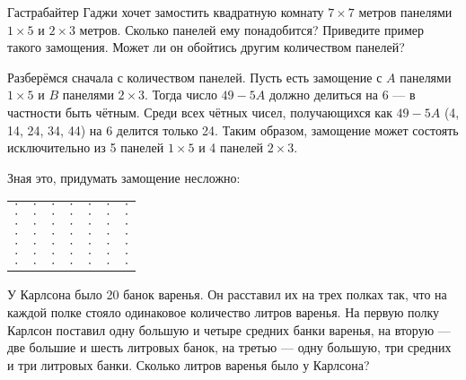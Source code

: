 

\begin{itemize}

\itB Гастрабайтер Гаджи хочет замостить квадратную комнату $7 \times 7$ метров панелями $1 \times 5$ и $2 \times 3$ метров. Сколько панелей ему понадобится? Приведите пример такого замощения. Может ли он обойтись другим количеством панелей?

\itr Разберёмся сначала с количеством панелей. Пусть есть замощение с $A$ панелями $1 \times 5$ и $B$ панелями $2 \times 3$. Тогда число $49 - 5A$ должно делиться на 6 — в частности быть чётным. Среди всех чётных чисел, получающихся как $49 - 5A$ (4, 14, 24, 34, 44) на 6 делится только 24. Таким образом, замощение может состоять исключительно из 5 панелей $1 \times 5$ и 4 панелей $2 \times 3$.

Зная это, придумать замощение несложно:

\def\hsp{\ \hspace{0.7cm}}
\def\bcel{\multicolumn{1}{|c|}{$\cdot$}}
\def\lcel{\multicolumn{1}{|c}{$\cdot$}}
\def\rcel{\multicolumn{1}{c|}{$\cdot$}}
\def\cel{\multicolumn{1}{c}{$\cdot$}}
\begin{center}
\begin{tabular}{|c|c|c|c|c|c|c|}
\hline
	\bcel & \cel & \cel & \cel & \lcel & \cel & \rcel \\
	\bcel & \cel & \cel & \cel & \lcel & \cel & \rcel \\ \cline{2-7}
	\bcel & \cel & \cel & \lcel & \cel & \lcel & \bcel \\
	\bcel & \cel & \cel & \lcel & \cel & \lcel & \bcel \\
	\bcel & \cel & \cel & \lcel & \cel & \lcel & \bcel \\ \cline{1-5}
	\lcel & \cel & \cel & \cel & \cel & \lcel & \bcel \\ \cline{1-5}
	\lcel & \cel & \cel & \cel & \cel & \lcel & \bcel \\ \hline
\end{tabular}
\end{center}

\itC У Карлсона было 20 банок варенья. Он расставил их на трех полках так, что на каждой полке стояло одинаковое количество литров варенья. На первую полку Карлсон поставил одну большую и четыре средних банки варенья, на вторую — две большие и шесть литровых банок, на третью — одну большую, три средних и три литровых банки. Сколько литров варенья было у Карлсона?


\end{itemize}
